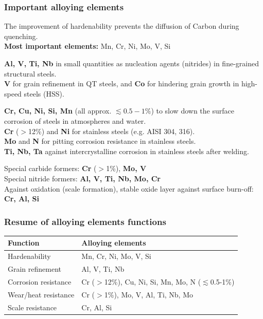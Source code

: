 \documentclass{article}
\begin{document}
\newpage
\subsubsection{Important alloying elements}
The improvement of hardenability prevents the diffusion of Carbon during quenching.\\
\textbf{Most important elements:} Mn, Cr, Ni, Mo, V, Si

\textbf{Al, V, Ti, Nb} in small quantities as nucleation agents (nitrides) in fine-grained structural steels.\\
\textbf{V} for grain refinement in QT steels, and \textbf{Co} for hindering grain growth in high-speed steels (HSS).

\textbf{Cr, Cu, Ni, Si, Mn} (all approx. $\lesssim 0.5-1\%$) to slow down the surface corrosion of steels in atmospheres and water.\\
\textbf{Cr} ($>$12\%) and \textbf{Ni} for stainless steels (e.g. AISI 304, 316).\\
\textbf{Mo} and \textbf{N} for pitting corrosion resistance in stainless steels.\\
\textbf{Ti, Nb, Ta} against intercrystalline corrosion in stainless steels after welding.

Special carbide formers: \textbf{Cr} ($>$1\%), \textbf{Mo, V}\\
Special nitride formers: \textbf{Al, V, Ti, Nb, Mo, Cr}\\

Against oxidation (scale formation), stable oxide layer against surface burn-off: \textbf{Cr, Al, Si}

\subsubsection{Resume of alloying elements functions}
\begin{table}[h!]
  \centering
  \begin{tabular}{|l|l|}
    \hline
    \textbf{Function} & \textbf{Alloying elements}\\
    \hline
    Hardenability & Mn, Cr, Ni, Mo, V, Si\\
    \hline
    Grain refinement & Al, V, Ti, Nb\\
    \hline
    Corrosion resistance & Cr ($>$12\%), Cu, Ni, Si, Mn, Mo, N ($\lesssim$0.5-1\%)\\
    \hline
    Wear/heat resistance & Cr ($>$1\%), Mo, V, Al, Ti, Nb, Mo\\
    \hline
    Scale resistance & Cr, Al, Si\\
    \hline
  \end{tabular}
\end{table}
\end{document}
